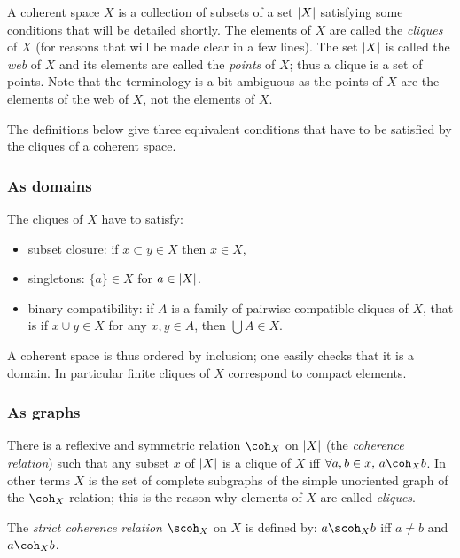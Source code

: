 A coherent space \(X\) is a collection of subsets of a set \(\left|X\right|\)
satisfying some conditions that will be detailed shortly. The elements
of \(X\) are called the \emph{cliques} of \(X\) (for reasons that will
be made clear in a few lines). The set \(\left|X\right|\) is called the
\emph{web} of \(X\) and its elements are called the \emph{points} of
\(X\); thus a clique is a set of points. Note that the terminology is a
bit ambiguous as the points of \(X\) are the elements of the web of
\(X\), not the elements of \(X\).

The definitions below give three equivalent conditions that have to be
satisfied by the cliques of a coherent space.

\subsubsection{As domains}\label{as-domains}

The cliques of \(X\) have to satisfy:

\begin{itemize}
\item subset closure: if \(x\subset y\in X\) then \(x\in X\),
\item singletons: \(\{a\}\in X\) for \(a\in\left|X\right|\).
\item binary compatibility: if \(A\) is a family of pairwise compatible
  cliques of \(X\), that is if \(x\cup y\in X\) for any \(x,y\in A\),
  then \(\bigcup A\in X\).
\end{itemize}

A coherent space is thus ordered by inclusion; one easily checks that it
is a domain. In particular finite cliques of \(X\) correspond to compact
elements.

\subsubsection{As graphs}\label{as-graphs}

There is a reflexive and symmetric relation \(\coh_X\) on \(\left|X\right|\) (the
\emph{coherence relation}) such that any subset \(x\) of \(\left|X\right|\) is a
clique of \(X\) iff \(\forall a,b\in x,\, a\coh_X b\). In other terms
\(X\) is the set of complete subgraphs of the simple unoriented graph of
the \(\coh_X\) relation; this is the reason why elements of \(X\) are
called \emph{cliques}.

The \emph{strict coherence relation} \(\scoh_X\) on \(X\) is defined by:
\(a\scoh_X b\) iff \(a\neq b\) and \(a\coh_X b\).

